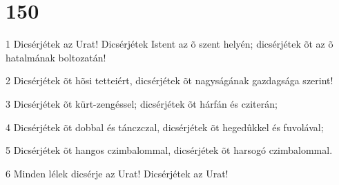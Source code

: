 \chapter{150}

\par 1 Dicsérjétek az Urat! Dicsérjétek Istent az õ szent helyén; dicsérjétek õt az õ hatalmának boltozatán!
\par 2 Dicsérjétek õt hõsi tetteiért, dicsérjétek õt nagyságának gazdagsága szerint!
\par 3 Dicsérjétek õt kürt-zengéssel; dicsérjétek õt hárfán és cziterán;
\par 4 Dicsérjétek õt dobbal és tánczczal, dicsérjétek õt hegedûkkel és fuvolával;
\par 5 Dicsérjétek õt hangos czimbalommal, dicsérjétek õt harsogó czimbalommal.
\par 6 Minden lélek dicsérje az Urat! Dicsérjétek az Urat!


